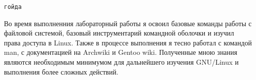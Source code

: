 



    \begin{lstlisting}[caption={Результат выполнения программы},label={lst:result}]
гойда
    \end{lstlisting}

    Во время выполненния лабораторный работы я освоил базовые команды работы с файловой системой, базовый инструментарий командной оболочки и изучил права доступа в Linux. Также в процессе выполнения я тесно работал с командой man, с документацией на Archwiki и Gentoo wiki. Полученные мною знания являются необходимым минимумом для дальнейшего изучения GNU/Linux и выполнения более сложных действий.
    \newpage





